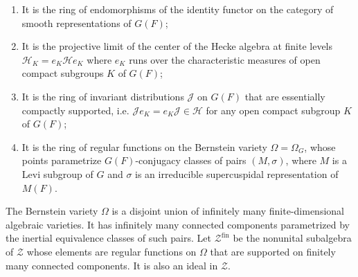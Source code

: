 \documentclass[iccmp]{ipbook}
\newcommand{\CH}{{\mathcal {H}}}
\newcommand{\CJ}{{\mathcal {J}}}
\newcommand{\CZ}{{\mathcal {Z}}}
\def\sig{{\sigma}}
\def\Ome{{\Omega}}
\newcommand{\fin}{\mathrm{fin}}
\newenvironment{num}{\begin{enumerate}}{\end{enumerate}}
\begin{document}
\begin{num}
\item\label{num:BC:1} It is the ring of endomorphisms of the identity functor on the category of smooth representations of $G(F)$;

\item\label{num:BC:2} It is the projective limit of the center of the Hecke algebra at finite levels $\CH_K = e_K\CH e_K$ where $e_K$ runs over the characteristic measures of open compact subgroups $K$ of $G(F)$;

\item\label{num:BC:3} It is the ring of invariant distributions $\CJ$ on $G(F)$ that are essentially compactly supported, i.e. $\CJ e_K = e_K\CJ\in \CH$ for any open compact subgroup $K$ of $G(F)$;

\item\label{num:BC:4} It is the ring of regular functions on the Bernstein variety $\Ome = \Ome_G$, whose points parametrize $G(F)$-conjugacy classes of pairs $(M,\sig)$, where $M$ is a Levi subgroup of $G$ and $\sig$ is an irreducible supercuspidal representation of $M(F)$.
\end{num}

The Bernstein variety $\Ome$ is a disjoint union of infinitely many finite-dimensional algebraic varieties. It has infinitely many connected components parametrized by the inertial equivalence classes of such pairs. Let $\CZ^\fin$ be the nonunital subalgebra of $\CZ$ whose elements are regular functions on $\Ome$ that are supported on finitely many connected components. It is also an ideal in $\CZ$.
\end{document}

